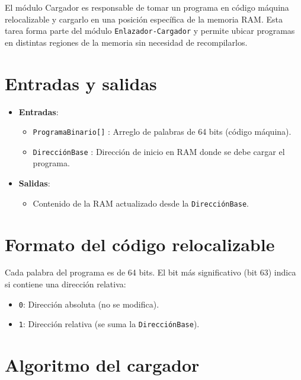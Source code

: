 \documentclass{article}
\begin{document}
El módulo {Cargador} es responsable de tomar un programa en código máquina relocalizable y cargarlo en una posición específica de la memoria RAM. Esta tarea forma parte del módulo \texttt{Enlazador-Cargador} y permite ubicar programas en distintas regiones de la memoria sin necesidad de recompilarlos.

\section*{Entradas y salidas}

\begin{itemize}
  \item \textbf{Entradas}:
  \begin{itemize}
    \item \texttt{ProgramaBinario[]} : Arreglo de palabras de 64 bits (código máquina).
    \item \texttt{DirecciónBase} : Dirección de inicio en RAM donde se debe cargar el programa.
  \end{itemize}
  \item \textbf{Salidas}:
  \begin{itemize}
    \item Contenido de la RAM actualizado desde la \texttt{DirecciónBase}.
  \end{itemize}
\end{itemize}

\section*{Formato del código relocalizable}

Cada palabra del programa es de 64 bits. El bit más significativo (bit 63) indica si contiene una dirección relativa:

\begin{itemize}
  \item \texttt{0}: Dirección absoluta (no se modifica).
  \item \texttt{1}: Dirección relativa (se suma la \texttt{DirecciónBase}).
\end{itemize}

\section*{Algoritmo del cargador}
\end{document}

